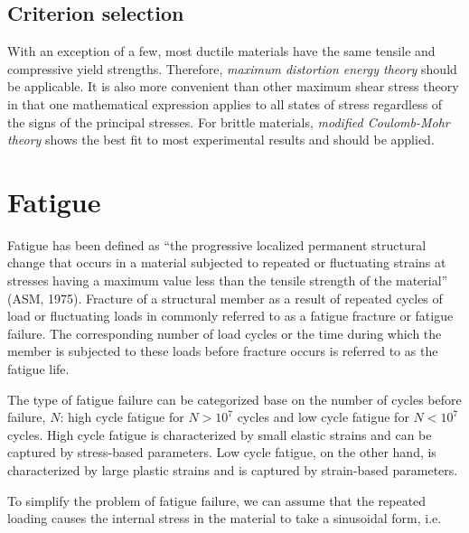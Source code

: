 \documentclass[
fontsize=10pt,
a4paper,
twosides=false,
open=any,
svgnames,
]{kaobook} %
\begin{document}
\subsection{Criterion selection}

With an exception of a few, most ductile materials have the same tensile and compressive yield strengths. Therefore, \emph{maximum distortion energy theory} should be applicable. It is also more convenient than other maximum shear stress theory in that one mathematical expression applies to all states of stress regardless of the signs of the principal stresses.
For brittle materials, \emph{modified Coulomb-Mohr theory} shows the best fit to most experimental results and should be applied.

\section{Fatigue} \label{section: fatigue failure}

Fatigue has been defined as “the progressive localized permanent structural change that occurs in a material subjected to repeated or fluctuating strains at stresses having a maximum value less than the tensile strength of the material” (ASM, 1975). Fracture of a structural member as a result of repeated cycles of load or fluctuating loads in commonly referred to as a fatigue fracture or fatigue failure. The corresponding number of load cycles or the time during which the member is subjected to these loads before fracture occurs is referred to as the fatigue life.

The type of fatigue failure can be categorized base on the number of cycles before failure, $N$: high cycle fatigue for $N > 10^7$ cycles and low cycle fatigue for $N < 10^7$ cycles. High cycle fatigue is characterized by small elastic strains and can be captured by stress-based parameters. Low cycle fatigue, on the other hand, is characterized by large plastic strains and is captured by strain-based parameters.

To simplify the problem of fatigue failure, we can assume that the repeated loading causes the internal stress in the material to take a sinusoidal form, i.e.

\begin{figure}[h]
  \centering
\end{figure}
\end{document}
